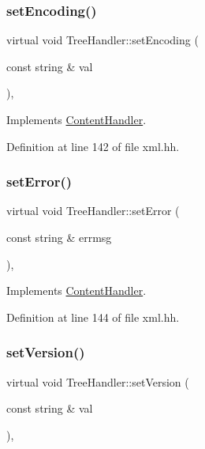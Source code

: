 \subsubsection{\texorpdfstring{setEncoding()}{setEncoding()}}
{\footnotesize\ttfamily virtual void Tree\+Handler\+::set\+Encoding (\begin{DoxyParamCaption}\item[{const string \&}]{val }\end{DoxyParamCaption})\hspace{0.3cm}{\ttfamily [inline]}, {\ttfamily [virtual]}}



Implements \mbox{\hyperlink{class_content_handler_ae8ed0998c2723da7740738811573542e}{Content\+Handler}}.



Definition at line 142 of file xml.\+hh.

\mbox{\label{class_tree_handler_a2e7990443435013045fc5fc5ae363492}} 
\subsubsection{\texorpdfstring{setError()}{setError()}}
{\footnotesize\ttfamily virtual void Tree\+Handler\+::set\+Error (\begin{DoxyParamCaption}\item[{const string \&}]{errmsg }\end{DoxyParamCaption})\hspace{0.3cm}{\ttfamily [inline]}, {\ttfamily [virtual]}}



Implements \mbox{\hyperlink{class_content_handler_aec6be0bfc55eda76da189b718a92d3a9}{Content\+Handler}}.



Definition at line 144 of file xml.\+hh.

\mbox{\label{class_tree_handler_ab16dcd42f1f701b5f892f2d68ff6d4df}} 
\subsubsection{\texorpdfstring{setVersion()}{setVersion()}}
{\footnotesize\ttfamily virtual void Tree\+Handler\+::set\+Version (\begin{DoxyParamCaption}\item[{const string \&}]{val }\end{DoxyParamCaption})\hspace{0.3cm}{\ttfamily [inline]}, {\ttfamily [virtual]}}



